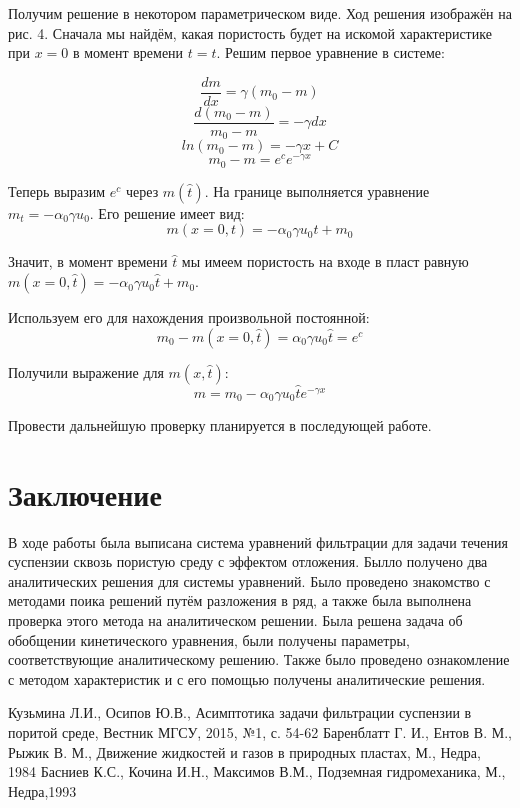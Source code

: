 \documentclass[a4paper,12pt]{article}
\begin{document}
\par Получим решение в некотором параметрическом виде. Ход решения изображён на рис. 4. Сначала мы найдём, какая пористость будет на искомой характеристике при $x=0$ в момент времени $t = \hat{t}$. Решим первое уравнение в системе:

$$\frac{dm}{dx}=\gamma(m_{0}-m)$$
$$\frac{d(m_{0}-m)}{m_{0}-m}=-\gamma dx$$
$$ln(m_{0}-m)=-\gamma x + C$$
$$m_{0}-m = e^{c}e^{-\gamma x}$$
\par Теперь выразим $e^{c}$ через $m(\hat{t})$. На границе выполняется уравнение $m_{t}=-\alpha_{0}\gamma u_{0}$. Его решение имеет вид: 
$$m(x=0,t)=-\alpha_{0}\gamma u_{0}t+m_{0}$$
\par Значит, в момент времени $\hat{t}$ мы имеем пористость на входе в пласт равную $m(x=0,\hat{t})=-\alpha_{0}\gamma u_{0}\hat{t}+m_{0}$. 
\par Используем его для нахождения произвольной постоянной:
$$m_{0}-m(x=0,\hat{t})= \alpha_{0}\gamma u_{0}\hat{t} = e^{c}$$
\par Получили выражение для $m(x,\hat{t})$:
$$m =m_{0} -\alpha_{0}\gamma u_{0}\hat{t}e^{-\gamma x}$$
\par Провести дальнейшую проверку планируется в последующей работе.

\pagebreak

\section{Заключение}
\par В ходе работы была выписана система уравнений фильтрации для задачи течения суспензии сквозь пористую среду с эффектом отложения. Былло получено два аналитических решения для системы уравнений. Было проведено знакомство с методами поика решений путём разложения в ряд, а также была выполнена проверка этого метода на аналитическом решении. Была решена задача об обобщении кинетического уравнения, были получены параметры, соответствующие аналитическому решению. Также было проведено ознакомление с методом характеристик и с его помощью получены аналитические решения.

\pagebreak

\begin{thebibliography}{99}
Кузьмина Л.И., Осипов Ю.В.,
Асимптотика задачи фильтрации суспензии в поритой среде,
Вестник МГСУ, 2015, №1, с. 54-62
Баренблатт Г. И., Ентов В. М., Рыжик В. М.,
Движение жидкостей и газов в природных пластах, М., 
Недра, 1984
Басниев К.С., Кочина И.Н., Максимов В.М.,
Подземная гидромеханика, М., 
Недра,1993

\end{thebibliography}
\end{document}

